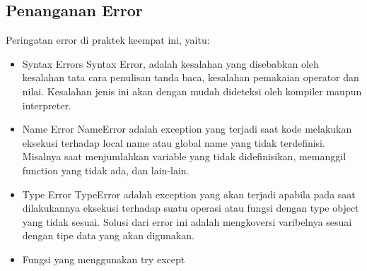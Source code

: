 \subsection{Penanganan Error}
Peringatan error di praktek keempat ini, yaitu:
	\begin{itemize}
		\item Syntax Errors
		Syntax Error, adalah kesalahan yang disebabkan oleh kesalahan tata cara penulisan tanda baca, kesalahan pemakaian operator dan nilai. Kesalahan jenis ini akan dengan mudah dideteksi oleh kompiler maupun interpreter.

		\item Name Error
		NameError adalah exception yang terjadi saat kode melakukan eksekusi terhadap local name atau global name yang tidak terdefinisi. Misalnya saat menjumlahkan variable yang tidak didefinisikan, memanggil function yang tidak ada, dan lain-lain.

		\item Type Error
		TypeError adalah exception yang akan terjadi apabila pada saat dilakukannya eksekusi terhadap suatu operasi atau fungsi dengan type object yang tidak sesuai. Solusi dari error ini adalah mengkoversi varibelnya sesuai dengan tipe data yang akan digunakan.
	

	\item Fungsi yang menggunakan try except
	
\end{itemize}